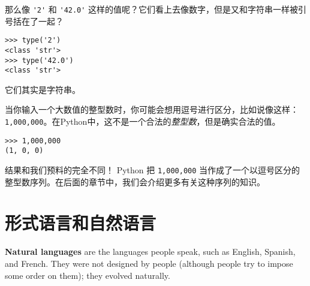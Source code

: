 那么像 \lstinline{'2'} 和 \lstinline{'42.0'} 这样的值呢？它们看上去像数字，但是又和字符串一样被引号括在了一起？
  

\begin{lstlisting}
>>> type('2')
<class 'str'>
>>> type('42.0')
<class 'str'>
\end{lstlisting}

%

它们其实是字符串。


当你输入一个大数值的整型数时，你可能会想用逗号进行区分，比如说像这样：\lstinline{1,000,000}。在Python中，这不是一个合法的{\em 整型数}，但是确实合法的值。

\begin{lstlisting}
>>> 1,000,000
(1, 0, 0)
\end{lstlisting}
%

结果和我们预料的完全不同！ Python 把 \lstinline{1,000,000} 当作成了一个以逗号区分的整型数序列。在后面的章节中，我们会介绍更多有关这种序列的知识。



\section{形式语言和自然语言}
  
  
  
  


{\bf Natural languages} are the languages people speak,
such as English, Spanish, and French.  They were not designed
by people (although people try to impose some order on them);
they evolved naturally.

